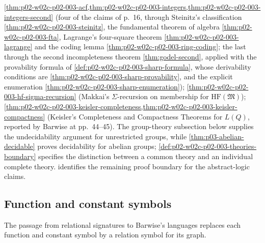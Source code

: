 \cref{thm:p02-w02c-p02-003-acf,thm:p02-w02c-p02-003-integers,thm:p02-w02c-p02-003-integers-second}
(four of the claims of p.~16, through Steinitz's classification
\cref{thm:p02-w02c-p02-003-steinitz}, the fundamental theorem of algebra
\cref{thm:p02-w02c-p02-003-fta}, Lagrange's four-square theorem
\cref{thm:p02-w02c-p02-003-lagrange} and the coding lemma
\cref{thm:p02-w02c-p02-003-ring-coding}; the last through the second
incompleteness theorem \cref{thm:godel-second}, applied with the provability
formula of \cref{def:p02-w02c-p02-003-sharp-formula}, whose derivability
conditions are \cref{thm:p02-w02c-p02-003-sharp-provability}, and the
explicit enumeration \cref{thm:p02-w02c-p02-003-sharp-enumeration});
\cref{thm:p02-w02c-p02-003-hf-sigma-recursion} (Makkai's
\(\Sigma\)-recursion on membership for \(\mathrm{HF}(\mathfrak M)\));
\cref{thm:p02-w02c-p02-003-keisler-completeness,thm:p02-w02c-p02-003-keisler-compactness}
(Keisler's Completeness and Compactness Theorems for \(L(Q)\), reported by
Barwise at pp.~44--45). The group-theory subsection below supplies the
undecidability argument for unrestricted groups, while
\cref{thm:p03-abelian-decidable} proves decidability for abelian groups;
\cref{def:p02-w02c-p02-003-theories-boundary} specifies the distinction
between a common theory and an individual complete theory.
 identifies the remaining
proof boundary for the abstract-logic claims.

\subsection{Function and constant symbols}
\label{sec:p02-w02c-p02-003-functions}

The passage from relational signatures to Barwise's languages replaces
each function and constant symbol by a relation symbol for its graph.


